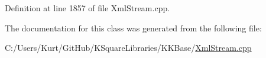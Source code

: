 Definition at line 1857 of file Xml\+Stream.\+cpp.



The documentation for this class was generated from the following file\+:\begin{DoxyCompactItemize}
\item 
C\+:/\+Users/\+Kurt/\+Git\+Hub/\+K\+Square\+Libraries/\+K\+K\+Base/\hyperlink{_xml_stream_8cpp}{Xml\+Stream.\+cpp}\end{DoxyCompactItemize}
